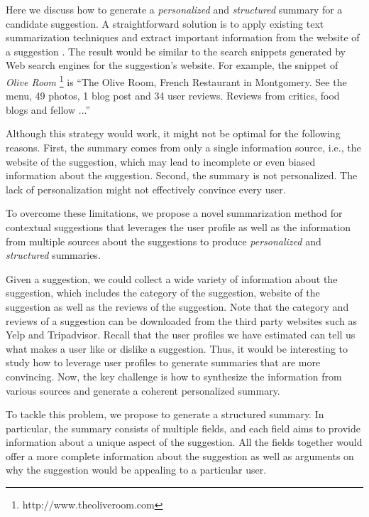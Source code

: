 Here we discuss how to generate a {\em personalized} 
and {\em structured} summary for a candidate suggestion.
A straightforward solution is to apply existing text
summarization techniques and extract important information 
from the website of a suggestion \cite{adriel:overview2013}.  The result would be 
similar to the search snippets generated by Web search 
engines for the suggestion's website. For example, 
the snippet of {\em Olive Room} \footnote{http://www.theoliveroom.com} is 
``The Olive Room, French Restaurant in Montgomery. 
See the menu, 49 photos, 1 blog post and 34 user reviews. 
Reviews from critics, food blogs and fellow ...''


Although this strategy would work, it might not be 
optimal for the following reasons. 
First, the summary comes from only a single information 
source, i.e., the website of the suggestion, which 
may lead to incomplete or even biased information 
about the suggestion. Second, the summary is not 
personalized. The lack of personalization might 
not effectively convince every user. 

To overcome these limitations, we propose a novel 
summarization method for contextual suggestions that 
leverages the user profile as well as the information 
from multiple sources about the suggestions to 
produce {\em personalized} and {\em structured} summaries. 

Given a suggestion, we could collect a wide variety of 
information about the suggestion, which includes 
the category of the suggestion, website of the suggestion 
as well as the reviews of the suggestion. Note that 
the category and reviews of a suggestion can be downloaded 
from the third party websites such as Yelp and Tripadvisor. 
Recall that the user profiles we have estimated can tell 
us what makes a user like or dislike a suggestion. Thus, 
it would be interesting to study how to leverage user 
profiles to generate summaries that are more convincing. 
Now, the key challenge is how to synthesize the information 
from various sources and generate a coherent personalized 
summary. 

To tackle this problem, we propose to generate a structured
summary. In particular, the summary consists of multiple 
fields, and each field aims to provide information about
a unique aspect of the suggestion. All the fields together
would offer a more complete information about the suggestion
as well as arguments on why the suggestion would be appealing
to a particular user. 

